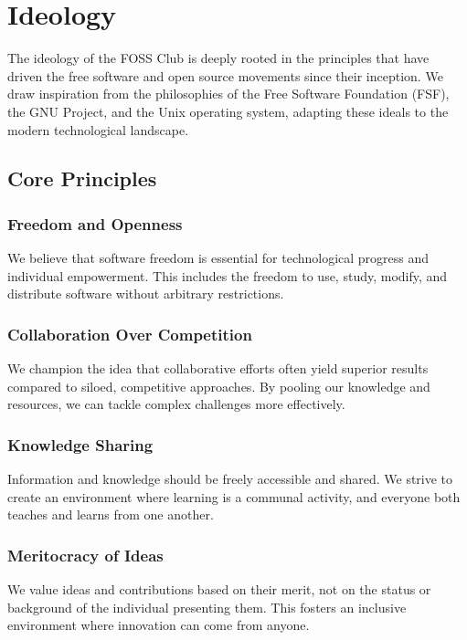 \documentclass[12pt,a4paper]{article}
\begin{document}
\section{Ideology}

The ideology of the FOSS Club is deeply rooted in the principles that have driven the free software and open source movements since their inception. We draw inspiration from the philosophies of the Free Software Foundation (FSF), the GNU Project, and the Unix operating system, adapting these ideals to the modern technological landscape.

\subsection{Core Principles}

\subsubsection{Freedom and Openness}
We believe that software freedom is essential for technological progress and individual empowerment. This includes the freedom to use, study, modify, and distribute software without arbitrary restrictions.

\subsubsection{Collaboration Over Competition}
We champion the idea that collaborative efforts often yield superior results compared to siloed, competitive approaches. By pooling our knowledge and resources, we can tackle complex challenges more effectively.

\subsubsection{Knowledge Sharing}
Information and knowledge should be freely accessible and shared. We strive to create an environment where learning is a communal activity, and everyone both teaches and learns from one another.

\subsubsection{Meritocracy of Ideas}
We value ideas and contributions based on their merit, not on the status or background of the individual presenting them. This fosters an inclusive environment where innovation can come from anyone.
\end{document}
